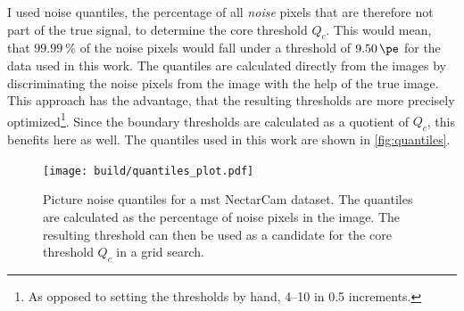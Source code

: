 I used noise quantiles, \ie the percentage of all \textit{noise} pixels that are therefore not part of the true signal,
to determine the core threshold \(Q_c\). This would mean, that \eg \(\SI{99.99}{\percent}\)
of the noise pixels would fall under a threshold of \(\SI{9.50}{\pe}\) for the data used in this work. The quantiles are calculated directly from the images by
discriminating the noise pixels from the image with the help of the true image. This approach has the
advantage, that the resulting thresholds are more precisely optimized\footnote{As opposed to setting the thresholds by hand, \eg{} \numrange{4}{10} in \num{0.5} increments.}.
Since the boundary thresholds are calculated as a quotient of \(Q_c\), this benefits here as well.
The quantiles used in this work are shown in \autoref{fig:quantiles}.
\begin{figure}
    \centering
    \texttt{[image: build/quantiles\_plot.pdf]}
    \caption{Picture noise quantiles for a \gls{mst} NectarCam dataset. The quantiles are calculated
    as the percentage of noise pixels in the image. The resulting threshold can then be used as a
    candidate for the core threshold \(Q_c\) in a grid search.}
    \label{fig:quantiles}
    \vspace{-0.5cm}
\end{figure}

